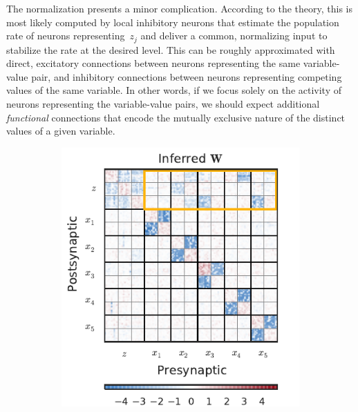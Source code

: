 The normalization presents a minor complication. According to the
theory, this is most likely computed by local inhibitory neurons
that estimate the population rate of neurons representing~$z_j$
and deliver a common, normalizing input to stabilize the rate
at the desired level. This can be roughly approximated with
direct, excitatory connections between neurons representing the same
variable-value pair, and inhibitory connections between neurons
representing competing values of the same variable. In other words,
if we focus solely on the activity of neurons representing the variable-value
pairs, we should expect additional \emph{functional} connections
that encode the mutually exclusive nature of the distinct values
of a given variable.

\begin{figure}[t!]
  \centering
  \begin{subfigure}[b]{2.75in}
   \centering
   \caption{}
   \vspace{-.3in}
   \includegraphics[width=\textwidth]{figures/ch7/mixture_network}
   \label{fig:mixture_network}
  \end{subfigure}
  ~
  \begin{subfigure}[b]{2.75in}

\end{subfigure}
\end{figure}
